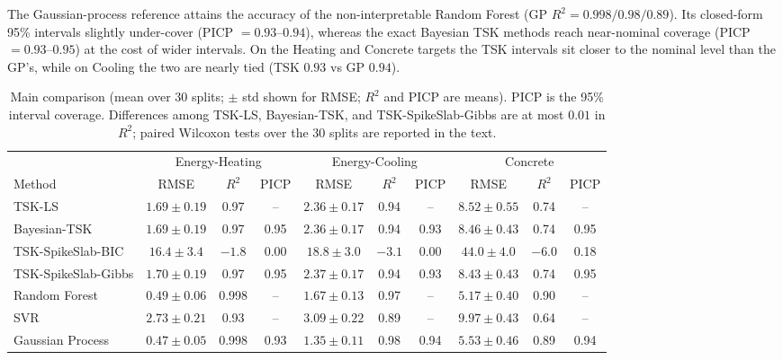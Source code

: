 \documentclass[review,1p,times]{elsarticle}
\begin{document}
The Gaussian-process reference \cite{rasmussen2006gaussian} attains the accuracy of the non-interpretable Random Forest (GP $R^2=0.998/0.98/0.89$).
Its closed-form 95\% intervals slightly under-cover (PICP $=0.93$--$0.94$), whereas the exact Bayesian TSK methods reach near-nominal coverage (PICP $=0.93$--$0.95$) at the cost of wider intervals.
On the Heating and Concrete targets the TSK intervals sit closer to the nominal level than the GP's, while on Cooling the two are nearly tied (TSK $0.93$ vs GP $0.94$).

\begin{table}[htbp]
\centering
\caption{Main comparison (mean over 30 splits; $\pm$ std shown for RMSE; $R^2$ and PICP are means). PICP is the 95\% interval coverage. Differences among TSK-LS, Bayesian-TSK, and TSK-SpikeSlab-Gibbs are at most $0.01$ in $R^2$; paired Wilcoxon tests over the 30 splits are reported in the text.}
\label{tab:main}
\footnotesize
\setlength{\tabcolsep}{3pt}
\begin{tabular}{lccc|ccc|ccc}
\toprule
& \multicolumn{3}{c|}{Energy-Heating} & \multicolumn{3}{c|}{Energy-Cooling} & \multicolumn{3}{c}{Concrete} \\
Method & RMSE & $R^2$ & PICP & RMSE & $R^2$ & PICP & RMSE & $R^2$ & PICP \\
\midrule
TSK-LS         & $1.69{\pm}0.19$ & 0.97 & -- & $2.36{\pm}0.17$ & 0.94 & -- & $8.52{\pm}0.55$ & 0.74 & -- \\
Bayesian-TSK   & $1.69{\pm}0.19$ & 0.97 & 0.95 & $2.36{\pm}0.17$ & 0.94 & 0.93 & $8.46{\pm}0.43$ & 0.74 & 0.95 \\
TSK-SpikeSlab-BIC & $16.4{\pm}3.4$ & $-1.8$ & 0.00 & $18.8{\pm}3.0$ & $-3.1$ & 0.00 & $44.0{\pm}4.0$ & $-6.0$ & 0.18 \\
TSK-SpikeSlab-Gibbs & $1.70{\pm}0.19$ & 0.97 & 0.95 & $2.37{\pm}0.17$ & 0.94 & 0.93 & $8.43{\pm}0.43$ & 0.74 & 0.95 \\
Random Forest  & $0.49{\pm}0.06$ & 0.998 & -- & $1.67{\pm}0.13$ & 0.97 & -- & $5.17{\pm}0.40$ & 0.90 & -- \\
SVR            & $2.73{\pm}0.21$ & 0.93 & -- & $3.09{\pm}0.22$ & 0.89 & -- & $9.97{\pm}0.43$ & 0.64 & -- \\
Gaussian Process & $0.47{\pm}0.05$ & 0.998 & 0.93 & $1.35{\pm}0.11$ & 0.98 & 0.94 & $5.53{\pm}0.46$ & 0.89 & 0.94 \\
\bottomrule
\end{tabular}
\end{table}
\end{document}
